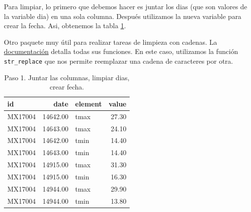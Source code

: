 \documentclass[]{article}
\newenvironment{Shaded}{\begin{snugshade}}{\end{snugshade}}
\newcommand{\KeywordTok}[1]{\textcolor[rgb]{0.13,0.29,0.53}{\textbf{{#1}}}}
\newcommand{\DataTypeTok}[1]{\textcolor[rgb]{0.13,0.29,0.53}{{#1}}}
\newcommand{\StringTok}[1]{\textcolor[rgb]{0.31,0.60,0.02}{{#1}}}
\newcommand{\CommentTok}[1]{\textcolor[rgb]{0.56,0.35,0.01}{\textit{{#1}}}}
\newcommand{\NormalTok}[1]{{#1}}
\begin{document}
Para limpiar, lo primero que debemos hacer es juntar los dias (que son
valores de la variable dia) en una sola columna. Después utilizamos la
nueva variable para crear la fecha. Asi, obtenemos la tabla
\ref{tab:clima1}.

\begin{Shaded}
\end{Shaded}

\begin{nota}[stringr]
Otro paquete muy útil para realizar tareas de limpieza con cadenas. 
La \href{https://cran.r-project.org/web/packages/stringr/stringr.pdf}{documentación}
detalla todas sus funciones. En este caso, utilizamos la función \texttt{str\_replace}
que nos permite reemplazar una cadena de caracteres por otra.
\end{nota}

\begin{table}[ht]
\centering
\begin{tabular}{lrlr}
  \hline
id & date & element & value \\ 
  \hline
MX17004 & 14642.00 & tmax & 27.30 \\ 
  MX17004 & 14643.00 & tmax & 24.10 \\ 
  MX17004 & 14642.00 & tmin & 14.40 \\ 
  MX17004 & 14643.00 & tmin & 14.40 \\ 
  MX17004 & 14915.00 & tmax & 31.30 \\ 
  MX17004 & 14915.00 & tmin & 16.30 \\ 
  MX17004 & 14944.00 & tmax & 29.90 \\ 
  MX17004 & 14944.00 & tmin & 13.80 \\ 
   \hline
\end{tabular}
\caption{Paso 1. Juntar las columnas, limpiar dias, crear fecha.} 
\label{tab:clima1}
\end{table}
\end{document}
